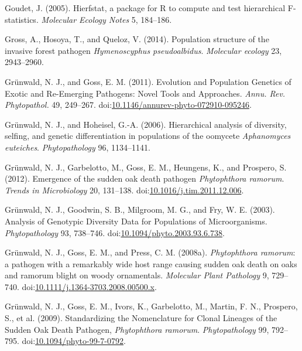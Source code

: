\documentclass[double,12pt]{beavtex}
\begin{document}
  \hypertarget{ref-goudet2005hierfstat}{}
  Goudet, J. (2005). Hierfstat, a package for R to compute and test
  hierarchical F-statistics. \emph{Molecular Ecology Notes} 5, 184--186.
  
  \hypertarget{ref-gross2014population}{}
  Gross, A., Hosoya, T., and Queloz, V. (2014). Population structure of
  the invasive forest pathogen \emph{Hymenoscyphus pseudoalbidus}.
  \emph{Molecular ecology} 23, 2943--2960.
  
  \hypertarget{ref-grunwald2011evolution}{}
  Grünwald, N. J., and Goss, E. M. (2011). Evolution and Population
  Genetics of Exotic and Re-Emerging Pathogens: Novel Tools and
  Approaches. \emph{Annu. Rev. Phytopathol.} 49, 249--267.
  doi:\href{https://doi.org/10.1146/annurev-phyto-072910-095246}{10.1146/annurev-phyto-072910-095246}.
  
  \hypertarget{ref-grunwald2006hierarchical}{}
  Grünwald, N. J., and Hoheisel, G.-A. (2006). Hierarchical analysis of
  diversity, selfing, and genetic differentiation in populations of the
  oomycete \emph{Aphanomyces euteiches}. \emph{Phytopathology} 96,
  1134--1141.
  
  \hypertarget{ref-grunwald2012emergence}{}
  Grünwald, N. J., Garbelotto, M., Goss, E. M., Heungens, K., and
  Prospero, S. (2012). Emergence of the sudden oak death pathogen
  \emph{Phytophthora ramorum}. \emph{Trends in Microbiology} 20, 131--138.
  doi:\href{https://doi.org/10.1016/j.tim.2011.12.006}{10.1016/j.tim.2011.12.006}.
  
  \hypertarget{ref-grunwald2003analysis}{}
  Grünwald, N. J., Goodwin, S. B., Milgroom, M. G., and Fry, W. E. (2003).
  Analysis of Genotypic Diversity Data for Populations of Microorganisms.
  \emph{Phytopathology} 93, 738--746.
  doi:\href{https://doi.org/10.1094/phyto.2003.93.6.738}{10.1094/phyto.2003.93.6.738}.
  
  \hypertarget{ref-grunwald2008phytophthora}{}
  Grünwald, N. J., Goss, E. M., and Press, C. M. (2008a).
  \emph{Phytophthora ramorum}: a pathogen with a remarkably wide host
  range causing sudden oak death on oaks and ramorum blight on woody
  ornamentals. \emph{Molecular Plant Pathology} 9, 729--740.
  doi:\href{https://doi.org/10.1111/j.1364-3703.2008.00500.x}{10.1111/j.1364-3703.2008.00500.x}.
  
  \hypertarget{ref-grunwald2009standardizing}{}
  Grünwald, N. J., Goss, E. M., Ivors, K., Garbelotto, M., Martin, F. N.,
  Prospero, S., et al. (2009). Standardizing the Nomenclature for Clonal
  Lineages of the Sudden Oak Death Pathogen, \emph{Phytophthora ramorum}.
  \emph{Phytopathology} 99, 792--795.
  doi:\href{https://doi.org/10.1094/phyto-99-7-0792}{10.1094/phyto-99-7-0792}.
  
\end{document}
